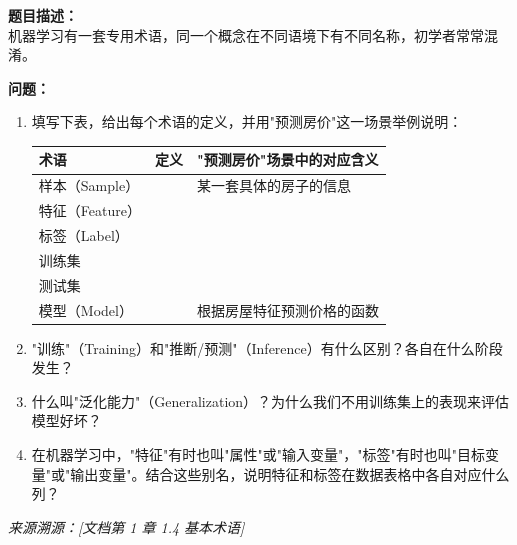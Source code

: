 \documentclass[a4paper,11pt]{ctexart}
\begin{document}
\begin{problembox}
    \textbf{题目描述：}\\
    机器学习有一套专用术语，同一个概念在不同语境下有不同名称，初学者常常混淆。

    \vspace{0.3cm}
    \textbf{问题：}
    \begin{enumerate}[(1)]
        \item 填写下表，给出每个术语的定义，并用"预测房价"这一场景举例说明：

        \begin{center}
        \begin{tabular}{p{2.5cm} p{4.5cm} p{4.5cm}}
            \toprule
            术语 & 定义 & "预测房价"场景中的对应含义 \\
            \midrule
            样本（Sample） & \underline{\hspace{4cm}} & 某一套具体的房子的信息 \\[1.2em]
            特征（Feature） & \underline{\hspace{4cm}} & \underline{\hspace{4cm}} \\[1.2em]
            标签（Label） & \underline{\hspace{4cm}} & \underline{\hspace{4cm}} \\[1.2em]
            训练集 & \underline{\hspace{4cm}} & \underline{\hspace{4cm}} \\[1.2em]
            测试集 & \underline{\hspace{4cm}} & \underline{\hspace{4cm}} \\[1.2em]
            模型（Model） & \underline{\hspace{4cm}} & 根据房屋特征预测价格的函数 \\
            \bottomrule
        \end{tabular}
        \end{center}

        \item "训练"（Training）和"推断/预测"（Inference）有什么区别？各自在什么阶段发生？
        \item 什么叫"泛化能力"（Generalization）？为什么我们不用训练集上的表现来评估模型好坏？
        \item 在机器学习中，"特征"有时也叫"属性"或"输入变量"，"标签"有时也叫"目标变量"或"输出变量"。结合这些别名，说明特征和标签在数据表格中各自对应什么列？
    \end{enumerate}
    {\color{gray}\small\textit{来源溯源：[文档第 1 章 1.4 基本术语]}}
\end{problembox}
\end{document}
